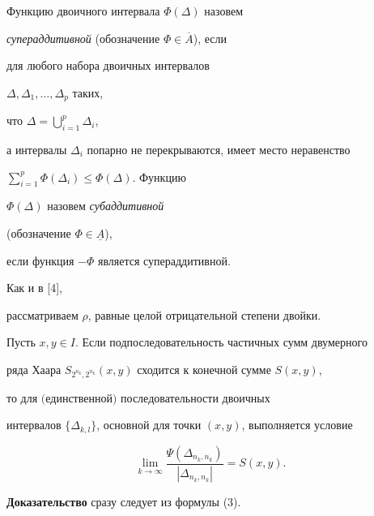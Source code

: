 \begin{defn}


Функцию двоичного интервала $\Phi(\Delta) $ назовем


{\it супераддитивной} (обозначение $\Phi \in \overline{A}$), если 


для любого набора двоичных интервалов 


$\Delta,\Delta _{1},\dotsc,\Delta _{p}$ таких, 


что $\Delta =\bigcup\limits _{i=1}^{p}\Delta _{i}$,


а интервалы $\Delta _{i}$ попарно не перекрываются, имеет место неравенство


$\sum\limits _{i=1}^{p}\Phi (\Delta _{i}) \leq \Phi (\Delta)$. Функцию 


$\Phi(\Delta)$ назовем {\it субаддитивной}


(обозначение $\Phi \in \underline{A}$), 


если функция $-\Phi$ является супераддитивной. 


\end{defn}





Как и в [4], 


рассматриваем $\rho$, равные целой отрицательной степени двойки. 





\begin{assrt}


Пусть $x,y \in I$. Если подпоследовательность частичных сумм двумерного 


ряда Хаара $S_{2^{n_k},2^{n_k}}(x,y)$ сходится к конечной сумме $S(x,y)$, 


то для $($единственной$)$ последовательности двоичных 


интервалов $\{\Delta_{k,l}\}$, основной для точки $(x,y)$, выполняется условие


$$ %


\lim\limits_{k \to \infty}\frac


{\Psi(\Delta_{n_k,n_k})}{|\Delta_{n_k,n_k}|}=S(x,y).


$$ %


\end{assrt}





{\bf Доказательство} сразу следует из формулы (3).





